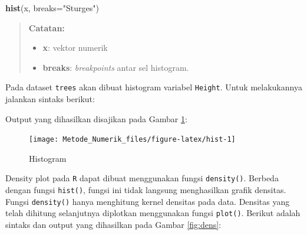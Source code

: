 \documentclass[
]{book}
\newenvironment{Shaded}{\begin{snugshade}}{\end{snugshade}}
\newcommand{\AttributeTok}[1]{\textcolor[rgb]{0.13,0.29,0.53}{#1}}
\newcommand{\CommentTok}[1]{\textcolor[rgb]{0.56,0.35,0.01}{\textit{#1}}}
\newcommand{\FunctionTok}[1]{\textcolor[rgb]{0.13,0.29,0.53}{\textbf{#1}}}
\newcommand{\NormalTok}[1]{#1}
\newcommand{\OtherTok}[1]{\textcolor[rgb]{0.56,0.35,0.01}{#1}}
\newcommand{\SpecialCharTok}[1]{\textcolor[rgb]{0.81,0.36,0.00}{\textbf{#1}}}
\newcommand{\StringTok}[1]{\textcolor[rgb]{0.31,0.60,0.02}{#1}}
\providecommand{\tightlist}{%
  \setlength{\itemsep}{0pt}\setlength{\parskip}{0pt}}
\theoremstyle{definition}
\theoremstyle{definition}
\theoremstyle{definition}
\theoremstyle{definition}
\theoremstyle{remark}
\begin{document}
\begin{Shaded}
\begin{Highlighting}[]
\FunctionTok{hist}\NormalTok{(x, }\AttributeTok{breaks=}\StringTok{"Sturges"}\NormalTok{)}
\end{Highlighting}
\end{Shaded}

\begin{quote}
\textbf{Catatan: }

\begin{itemize}
\tightlist
\item
  \textbf{x}: vektor numerik
\item
  \textbf{breaks}: \emph{breakpoints} antar sel histogram.
\end{itemize}
\end{quote}

Pada dataset \texttt{trees} akan dibuat histogram variabel \texttt{Height}. Untuk melakukannya jalankan sintaks berikut:

\begin{Shaded}
\end{Shaded}

Output yang dihasilkan disajikan pada Gambar \ref{fig:hist}:

\begin{figure}

{\centering \texttt{[image: Metode\_Numerik\_files/figure-latex/hist-1]} 

}

\caption{Histogram}\label{fig:hist}
\end{figure}

Density plot pada \texttt{R} dapat dibuat menggunakan fungsi \texttt{density()}. Berbeda dengan fungsi \texttt{hist()}, fungsi ini tidak langsung menghasilkan grafik densitas. Fungsi \texttt{density()} hanya menghitung kernel densitas pada data. Densitas yang telah dihitung selanjutnya diplotkan menggunakan fungsi \texttt{plot()}. Berikut adalah sintaks dan output yang dihasilkan pada Gambar \ref{fig:dens}:

\begin{Shaded}
\end{Shaded}
\end{document}
